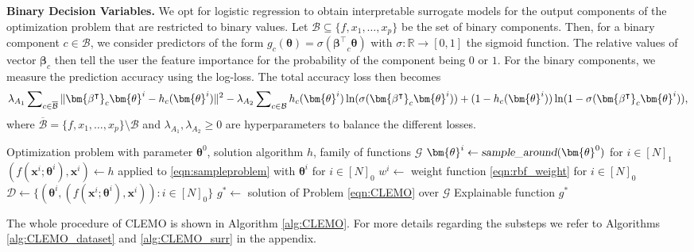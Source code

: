 \documentclass{article}
\theoremstyle{plain}
\theoremstyle{definition}
\theoremstyle{remark}
\begin{document}
\textbf{Binary Decision Variables.} We opt for logistic regression to obtain interpretable surrogate models for the output components of the optimization problem that are restricted to binary values. Let $\mathcal{B}\subseteq \{f,x_1,\hdots,x_p\}$ be the set of binary components. Then, for a binary component $c\in\mathcal{B}$, we consider predictors of the form $g_{c}(\bm{\theta}) = \sigma( \bm{\beta^{\intercal}}_{c} \bm{\theta})$ with $\sigma: \mathbb R \to [0,1]$ the sigmoid function. The relative values of vector $\bm{\beta}_{c}$ then tell the user the feature importance for the probability of the component being $0$ or $1$. For the binary components, we measure the prediction accuracy using the log-loss. The total accuracy loss then becomes 
\begin{equation}\label{eqn:bin_loss}
\lambda_{A_1}\sum\nolimits_{c\in\overline{\mathcal{B}}}\|\bm{\beta^{\intercal}}_{c} \bm{\theta}^i - h_{c}(\bm{\theta}^i)\|^2 - \lambda_{A_2}\sum\nolimits_{c\in\mathcal{B}}h_{c}(\bm{\theta}^i) \ln(\sigma(\bm{\beta^{\intercal}}_{c} \bm{\theta}^i))+(1-h_{c}(\bm{\theta}^i))\ln(1-\sigma(\bm{\beta^{\intercal}}_{c} \bm{\theta}^i)),\notag
\end{equation}
where $ \overline{\mathcal{B}}=\{f, x_1, \hdots, x_p \} \setminus \mathcal{B}$ and $ \lambda_{A_1}, \lambda_{A_2}\geq 0$ are hyperparameters to balance the different losses.
\begin{algorithm}[tb]
\vskip -0.05cm
   \caption{CLEMO}
   \label{alg:CLEMO}
\begin{algorithmic}
    Optimization problem with parameter $\bm{\theta}^0$, solution algorithm $h$, family of functions $\mathcal{G}$
   \STATE $\bm{\theta}^i\leftarrow \textsl{sample\_around}(\bm{\theta}^0)$ for $i\in [N]_1$
   \STATE $(f(\bm{x}^i;\bm{\theta}^i),\bm{x}^i) \leftarrow h$ applied to \eqref{eqn:sampleproblem} with  $\bm{\theta}^i$ for $i\in[N]_0$
   \STATE $w^i \leftarrow$  weight function \eqref{eqn:rbf_weight} for $i\in [N]_0$
   \STATE $\mathcal{D}\leftarrow  \{(\bm{\theta}^i, (f(\bm{x}^i;\bm{\theta}^i),\bm{x}^i)):i\in [N]_0\}$
   \STATE $g^*\leftarrow $ solution of Problem \eqref{eqn:CLEMO} over $\mathcal{G}$
     Explainable function $g^*$
\end{algorithmic}
\vskip -0.05cm
\end{algorithm}

The whole procedure of CLEMO is shown in Algorithm \ref{alg:CLEMO}. For more details regarding the substeps we refer to Algorithms \ref{alg:CLEMO_dataset} and \ref{alg:CLEMO_surr} in the appendix.
\end{document}

